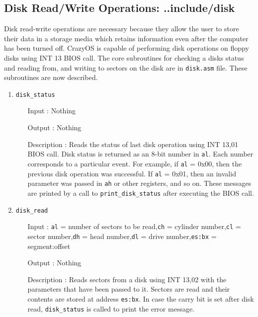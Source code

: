 \subsection{Disk Read/Write Operations: ..include/disk}
Disk read-write operations are necessary because they allow the user to store their data in a storage media which retains information even after the computer has been turned off. CrazyOS is capable of performing disk operations on floppy disks using INT 13 BIOS call. The core subroutines for checking a disks status and reading from, and writing to sectors on the disk are in \texttt{disk.asm} file. These subroutines are now described. 
\begin{enumerate}
  \item \texttt{disk\_status}
  		\begin{enumerate}[align=parleft, labelsep=2cm, leftmargin=1.06in]
  		  \item[Input]: Nothing
  		  \item[Output]: Nothing
  		  \item[Description]: Reads the status of last disk operation using INT 13,01 BIOS call. Disk status is returned as an 8-bit number in \texttt{al}. Each number corresponds to a particular event. For example, if \texttt{al} = 0x00, then the previous disk operation was successful. If \texttt{al} = 0x01, then an invalid parameter was passed in \texttt{ah} or other registers, and so on. These messages are printed by a call to \texttt{print\_disk\_status} after executing the BIOS call.
  		\end{enumerate}
  \item \texttt{disk\_read}
  		\begin{enumerate}[align=parleft, labelsep=2cm, leftmargin=1.06in]
  		  \item[Input]: \texttt{al} = number of sectors to be read,\newline\texttt{ch} = cylinder number,\newline\texttt{cl} = sector number,\newline\texttt{dh} = head number,\newline\texttt{dl} = drive number,\newline\texttt{es:bx} = segment:offset
  		  \item[Output]: Nothing
  		  \item[Description]: Reads sectors from a disk using INT 13,02 with the parameters that have been passed to it. Sectors are read and their contents are stored at address \texttt{es:bx}. In case the carry bit is set after disk read, \texttt{disk\_status} is called to print the error message.

\end{enumerate}
\end{enumerate}

